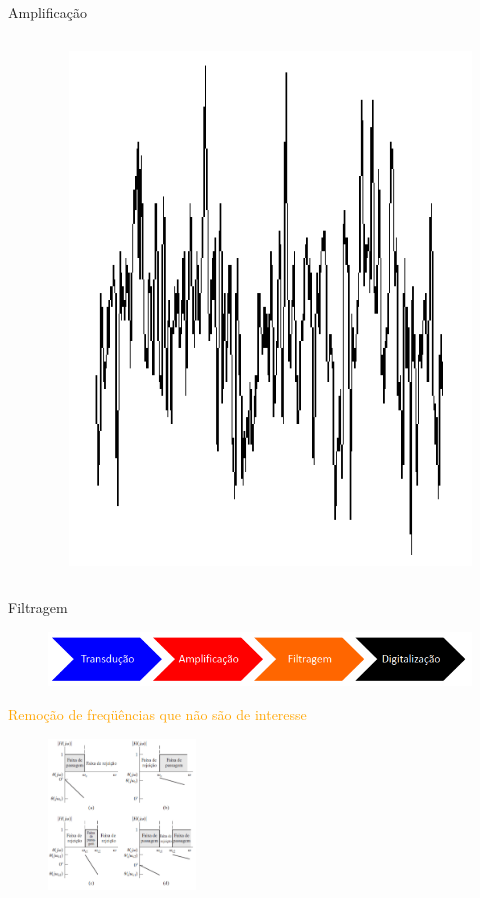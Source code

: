 \documentclass[aspectratio=169,
				xcolor=table]{beamer}
\begin{document}
\begin{frame}{Amplificação}
\begin{columns}
\begin{column}{0.25\textwidth}
			\end{column}
			\begin{column}{0.4\textwidth}
				\begin{figure}[hbtp]
					\centering
					\includegraphics[width=.7\textwidth, keepaspectratio]{../figs/cap01/sinalamp.png}
				\end{figure}	
				
			\end{column}
		\end{columns}
	
	\end{frame}
	
	\begin{frame}{Filtragem}
		
		\begin{figure}[hbtp]
			\centering
			\includegraphics[width=\textwidth, keepaspectratio]{../figs/cap01/sistema01.png}
		\end{figure}	
		
		\textcolor{orange}{Remoção de freqüências que não são de interesse}
		
		\begin{figure}[hbtp]
			\centering
			\includegraphics[height=4cm, keepaspectratio]{../figs/cap01/filtro.png}
		\end{figure}	
		
	\end{frame}
	
\end{document}
